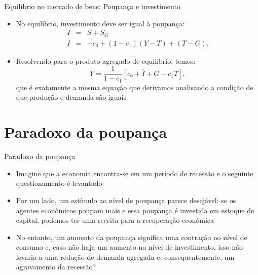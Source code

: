 \documentclass[10pt]{beamer}
\begin{document}
\begin{frame}{Equilíbrio no mercado de bens: Poupança e investimento}
    \begin{itemize}
        \item No equilíbrio, investimento deve ser igual à poupança:
              \begin{eqnarray}
                  I &=& S + S_G \nonumber \\
                  I &=& -c_0 + (1 - c_1)(Y - T) + (T - G). \nonumber
              \end{eqnarray}

        \item Resolvendo para o produto agregado de equilíbrio, temos:
              \begin{equation}
                  Y = \frac{1}{1-c_1}[c_0 + \bar{I} + G - c_1T],
                  \label{aula5_eq2}
              \end{equation}
              que é exatamente a mesma equação que derivamos analisando a condição de que produção e demanda são iguais
    \end{itemize}
\end{frame}

\section{Paradoxo da poupança}
\begin{frame}{Paradoxo da poupança}
    \begin{itemize}
        \item Imagine que a economia encontra-se em um período de recessão e o seguinte questionamento é levantado:\bigskip

              \bigskip

        \item Por um lado, um estímulo ao nível de poupança parece desejável: se os agentes econômicos poupam mais e essa poupança é investida em estoque de capital, podemos ter uma receita para a recuperação econômica\bigskip

        \item No entanto, um aumento da poupança significa uma contração no nível de consumo e, caso não haja um aumento no nível de investimento, isso não levaria a uma redução de demanda agregada e, consequentemente, um agravamento da recessão?
    \end{itemize}
\end{frame}
\end{document}

